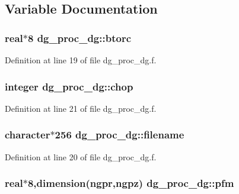 \subsection{Variable Documentation}
\hypertarget{namespacedg__proc__dg_4858e0f24b3a2b945edb969aa3397018}{
\subsubsection[btorc]{\setlength{\rightskip}{0pt plus 5cm}real$\ast$8 {\bf dg\_\-proc\_\-dg::btorc}}}
\label{namespacedg__proc__dg_4858e0f24b3a2b945edb969aa3397018}




Definition at line 19 of file dg\_\-proc\_\-dg.f.\hypertarget{namespacedg__proc__dg_db49100523d7293683f277516929fea3}{
\subsubsection[chop]{\setlength{\rightskip}{0pt plus 5cm}integer {\bf dg\_\-proc\_\-dg::chop}}}
\label{namespacedg__proc__dg_db49100523d7293683f277516929fea3}




Definition at line 21 of file dg\_\-proc\_\-dg.f.\hypertarget{namespacedg__proc__dg_afbcde755b792e734f84703b785a4725}{
\subsubsection[filename]{\setlength{\rightskip}{0pt plus 5cm}character$\ast$256 {\bf dg\_\-proc\_\-dg::filename}}}
\label{namespacedg__proc__dg_afbcde755b792e734f84703b785a4725}




Definition at line 20 of file dg\_\-proc\_\-dg.f.\hypertarget{namespacedg__proc__dg_34d4b6308d30eeff40494270ca3e41dd}{
\subsubsection[pfm]{\setlength{\rightskip}{0pt plus 5cm}real$\ast$8,dimension(ngpr,ngpz) {\bf dg\_\-proc\_\-dg::pfm}}}
\label{namespacedg__proc__dg_34d4b6308d30eeff40494270ca3e41dd}




